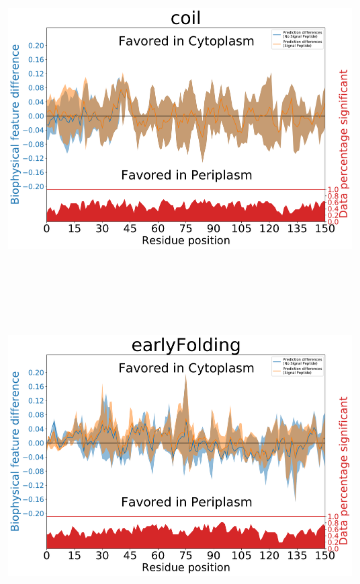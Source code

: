 ~\begin{figure}[h!]
	\ContinuedFloat
	~\begin{subfigure}[b]{\linewidth}
		\includegraphics[width=\linewidth, height=0.43\textheight, keepaspectratio]
	{./results/twins/img/coil.pdf}
		\caption{}
		\label{fig:twin_coil}
	~\end{subfigure}
	\newline
	~\begin{subfigure}[b]{\linewidth}
			\includegraphics[width=\linewidth, height=0.43\textheight, keepaspectratio]
	{./results/twins/img/earlyFolding.pdf}
		\caption{}
		\label{fig:twin_earlyfolding}
	~\end{subfigure}
~\end{figure}


